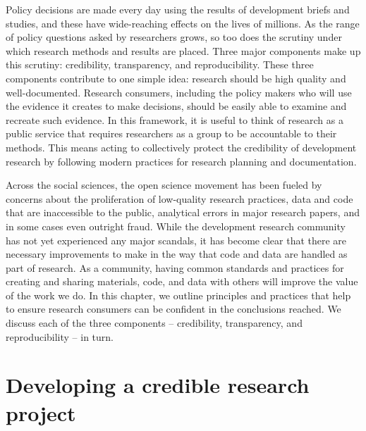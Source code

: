 
\begin{fullwidth}

	Policy decisions are made every day using the results of development briefs and studies,
	and these have wide-reaching effects on the lives of millions.
	As the range of policy questions asked by researchers grows,
	so too does the scrutiny under which research methods and results are placed.
  Three major components make up this scrutiny:
  credibility, transparency, and reproducibility.
  These three components contribute to one simple idea:
  research should be high quality and well-documented.
  Research consumers,
  including the policy makers who will use the evidence it creates to make decisions,
  should be easily able to examine and recreate such evidence.
	In this framework, it is useful to think of research as a public service
  that requires researchers as a group to be accountable to their methods.
	This means acting to collectively protect the credibility of development research
	by following modern practices for research planning and documentation.

  Across the social sciences, the open science movement has been fueled
  by concerns about the proliferation of low-quality research practices,
	data and code that are inaccessible to the public,
  analytical errors in major research papers,
	and in some cases even outright fraud.
  While the development research community has not yet
  experienced any major scandals,
  it has become clear that there are necessary improvements to make
	in the way that code and data are handled as part of research.
  As a community, having common standards and practices
  for creating and sharing materials, code, and data with others
  will improve the value of the work we do.
	In this chapter, we outline principles and practices that help to ensure
	research consumers can be confident in the conclusions reached.
  We discuss each of the three components -- 
  credibility, transparency, and reproducibility -- in turn.

\end{fullwidth}


\section{Developing a credible research project}

